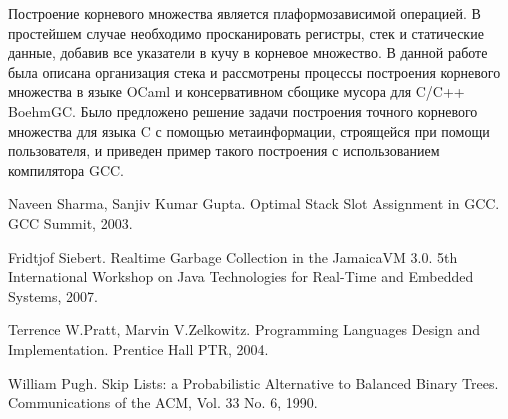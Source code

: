 Построение корневого множества является плаформозависимой операцией. В простейшем случае необходимо просканировать 
регистры, стек и статические данные, добавив все указатели в кучу в корневое множество. В данной работе была описана 
организация стека и рассмотрены процессы построения корневого множества в языке OCaml и консервативном сбощике мусора 
для C/C++ BoehmGC. Было предложено решение задачи построения точного корневого множества для языка C с помощью метаинформации, 
строящейся при помощи пользователя, и приведен пример такого построения с использованием компилятора GCC.

\begin{thebibliography}{99}
Naveen Sharma, Sanjiv Kumar Gupta. 
Optimal Stack Slot Assignment in GCC. GCC Summit, 2003.

Fridtjof Siebert. 
Realtime Garbage Collection in the JamaicaVM 3.0. 5th International Workshop on Java Technologies for Real-Time and Embedded Systems, 2007.

Terrence W.Pratt, Marvin V.Zelkowitz. 
Programming Languages Design and Implementation. Prentice Hall PTR, 2004.

William Pugh. Skip Lists: a Probabilistic Alternative to Balanced Binary Trees. Communications of the ACM, Vol. 33 No. 6, 1990.
\end{thebibliography}
